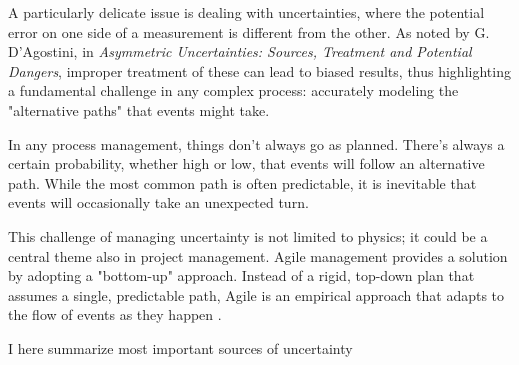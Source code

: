\documentclass{article}
\begin{document}
A particularly delicate issue is dealing with uncertainties, where the potential error on one side of a measurement is different from the other. As noted by G. D’Agostini, in \textit{Asymmetric Uncertainties: Sources, Treatment and Potential Dangers}, improper treatment of these can lead to biased results, thus highlighting a fundamental challenge in any complex process: accurately modeling the "alternative paths" that events might take. 


In any process management, things don't always go as planned. There's always a certain probability, whether high or low, that events will follow an alternative path. While the most common path is often predictable, it is inevitable that events will occasionally take an unexpected turn.

This challenge of managing uncertainty is not limited to physics; it could be a central theme also in project management. Agile management provides a solution by adopting a "bottom-up" approach. Instead of a rigid, top-down plan that assumes a single, predictable path, Agile is an empirical approach that adapts to the flow of events as they happen \cite{beck2001agile}.

I here summarize most important sources of uncertainty
\end{document}
